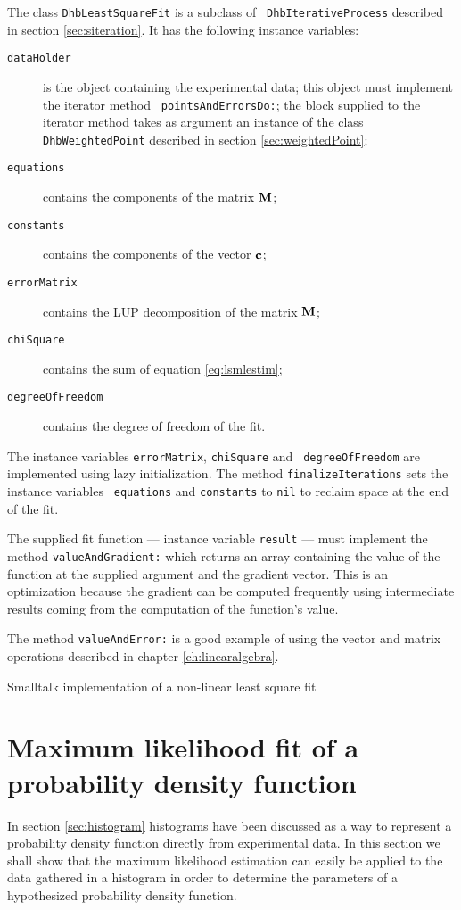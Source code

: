 \documentclass[twoside]{book}
\begin{document}
The class {\tt DhbLeastSquareFit} is a subclass of {\tt
DhbIterativeProcess} described in section \ref{sec:siteration}. It
has the following instance variables:
\begin{description}
  \item[\tt dataHolder] is the object containing the experimental
  data; this object must implement the iterator method {\tt
  pointsAndErrorsDo:}; the block supplied to the iterator method
  takes as argument an instance of the class {\tt
  DhbWeightedPoint} described in section \ref{sec:weightedPoint};
  \item[\tt equations] contains the components of the matrix ${\bf
  M}$;
  \item[\tt constants] contains the components of the vector ${\bf
  c}$;
  \item[\tt errorMatrix] contains the LUP decomposition of the matrix ${\bf
  M}$;
  \item[\tt chiSquare] contains the sum of equation \ref{eq:lsmlestim};
  \item[\tt degreeOfFreedom] contains the degree of freedom of the
  fit.
\end{description}
The instance variables {\tt errorMatrix}, {\tt chiSquare} and {\tt
degreeOfFreedom} are implemented using lazy initialization. The
method {\tt finalizeIterations} sets the instance variables {\tt
equations} and {\tt constants} to {\tt nil} to reclaim space at
the end of the fit.

The supplied fit function --- instance variable {\tt result} ---
must implement the method {\tt valueAndGradient:} which returns an
array containing the value of the function at the supplied
argument and the gradient vector. This is an optimization because
the gradient can be computed frequently using intermediate results
coming from the computation of the function's value.

The method {\tt valueAndError:} is a good example of using the
vector and matrix operations described in chapter
\ref{ch:linearalgebra}.

\begin{listing} Smalltalk implementation of a non-linear
least square fit \label{ls:lsfnonlin}

\end{listing}

\section{Maximum likelihood fit of a probability density function}
\label{sec:mlfhist} In section \ref{sec:histogram} histograms have
been discussed as a way to represent a probability density
function directly from experimental data. In this section we shall
show that the maximum likelihood estimation can easily be applied
to the data gathered in a histogram in order to determine the
parameters of a hypothesized probability density function.
\end{document}
